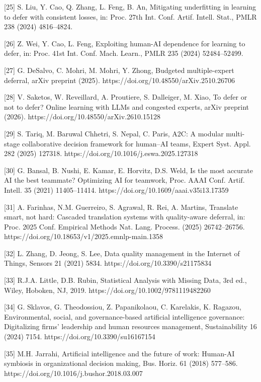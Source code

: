 \documentclass[
  11pt,
]{article}
\begin{document}
{[}25{]} S. Liu, Y. Cao, Q. Zhang, L. Feng, B. An, Mitigating
underfitting in learning to defer with consistent losses, in: Proc. 27th
Int. Conf. Artif. Intell. Stat., PMLR 238 (2024) 4816--4824.

{[}26{]} Z. Wei, Y. Cao, L. Feng, Exploiting human-AI dependence for
learning to defer, in: Proc. 41st Int. Conf. Mach. Learn., PMLR 235
(2024) 52484--52499.

{[}27{]} G. DeSalvo, C. Mohri, M. Mohri, Y. Zhong, Budgeted
multiple-expert deferral, arXiv preprint (2025).
https://doi.org/10.48550/arXiv.2510.26706

{[}28{]} V. Saketos, W. Reveillard, A. Proutiere, S. Dalleiger, M. Xiao,
To defer or not to defer? Online learning with LLMs and congested
experts, arXiv preprint (2026).
https://doi.org/10.48550/arXiv.2610.15128

{[}29{]} S. Tariq, M. Baruwal Chhetri, S. Nepal, C. Paris, A2C: A
modular multi-stage collaborative decision framework for human--AI
teams, Expert Syst. Appl. 282 (2025) 127318.
https://doi.org/10.1016/j.eswa.2025.127318

{[}30{]} G. Bansal, B. Nushi, E. Kamar, E. Horvitz, D.S. Weld, Is the
most accurate AI the best teammate? Optimizing AI for teamwork, Proc.
AAAI Conf. Artif. Intell. 35 (2021) 11405--11414.
https://doi.org/10.1609/aaai.v35i13.17359

{[}31{]} A. Farinhas, N.M. Guerreiro, S. Agrawal, R. Rei, A. Martins,
Translate smart, not hard: Cascaded translation systems with
quality-aware deferral, in: Proc. 2025 Conf. Empirical Methods Nat.
Lang. Process. (2025) 26742--26756.
https://doi.org/10.18653/v1/2025.emnlp-main.1358

{[}32{]} L. Zhang, D. Jeong, S. Lee, Data quality management in the
Internet of Things, Sensors 21 (2021) 5834.
https://doi.org/10.3390/s21175834

{[}33{]} R.J.A. Little, D.B. Rubin, Statistical Analysis with Missing
Data, 3rd ed., Wiley, Hoboken, NJ, 2019.
https://doi.org/10.1002/9781119482260

{[}34{]} G. Sklavos, G. Theodossiou, Z. Papanikolaou, C. Karelakis, K.
Ragazou, Environmental, social, and governance-based artificial
intelligence governance: Digitalizing firms' leadership and human
resources management, Sustainability 16 (2024) 7154.
https://doi.org/10.3390/su16167154

{[}35{]} M.H. Jarrahi, Artificial intelligence and the future of work:
Human-AI symbiosis in organizational decision making, Bus. Horiz. 61
(2018) 577--586. https://doi.org/10.1016/j.bushor.2018.03.007
\end{document}
